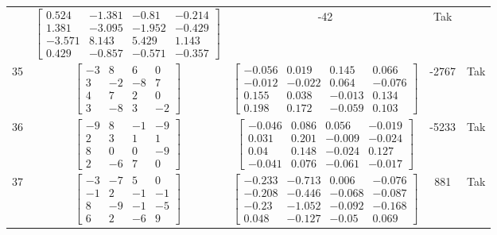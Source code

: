 \documentclass[a4paper,12pt]{article}
\begin{document}
\begin{tabular}{c c c c c}
&
$\begin{bmatrix} 0.524 & -1.381 & -0.81 & -0.214 \\ 1.381 & -3.095 & -1.952 & -0.429 \\ -3.571 & 8.143 & 5.429 & 1.143 \\ 0.429 & -0.857 & -0.571 & -0.357 \end{bmatrix}$
&
-42
&
Tak
\\
35
&
$\begin{bmatrix} -3 & 8 & 6 & 0 \\ 3 & -2 & -8 & 7 \\ 4 & 7 & 2 & 0 \\ 3 & -8 & 3 & -2 \end{bmatrix}$
&
$\begin{bmatrix} -0.056 & 0.019 & 0.145 & 0.066 \\ -0.012 & -0.022 & 0.064 & -0.076 \\ 0.155 & 0.038 & -0.013 & 0.134 \\ 0.198 & 0.172 & -0.059 & 0.103 \end{bmatrix}$
&
-2767
&
Tak
\\
36
&
$\begin{bmatrix} -9 & 8 & -1 & -9 \\ 2 & 3 & 1 & 1 \\ 8 & 0 & 0 & -9 \\ 2 & -6 & 7 & 0 \end{bmatrix}$
&
$\begin{bmatrix} -0.046 & 0.086 & 0.056 & -0.019 \\ 0.031 & 0.201 & -0.009 & -0.024 \\ 0.04 & 0.148 & -0.024 & 0.127 \\ -0.041 & 0.076 & -0.061 & -0.017 \end{bmatrix}$
&
-5233
&
Tak
\\
37
&
$\begin{bmatrix} -3 & -7 & 5 & 0 \\ -1 & 2 & -1 & -1 \\ 8 & -9 & -1 & -5 \\ 6 & 2 & -6 & 9 \end{bmatrix}$
&
$\begin{bmatrix} -0.233 & -0.713 & 0.006 & -0.076 \\ -0.208 & -0.446 & -0.068 & -0.087 \\ -0.23 & -1.052 & -0.092 & -0.168 \\ 0.048 & -0.127 & -0.05 & 0.069 \end{bmatrix}$
&
881
&
Tak
\\

\end{tabular}
\end{document}
